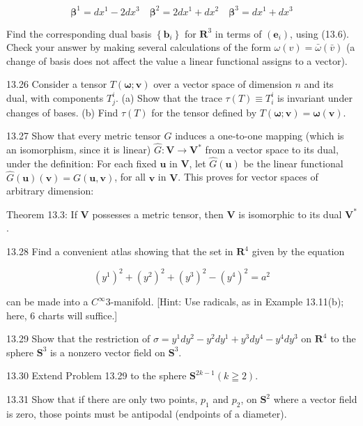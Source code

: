 \documentclass[10pt]{article}
\begin{document}
$$
\boldsymbol{\beta}^{1}=d x^{1}-2 d x^{3} \quad \boldsymbol{\beta}^{2}=2 d x^{1}+d x^{2} \quad \boldsymbol{\beta}^{3}=d x^{1}+d x^{3}
$$

Find the corresponding dual basis $\left\{\mathbf{b}_{i}\right\}$ for $\mathbf{R}^{3}$ in terms of $\left(\mathbf{e}_{i}\right)$, using (13.6). Check your answer by making several calculations of the form $\omega(v)=\bar{\omega}(\bar{v})$ (a change of basis does not affect the value a linear functional assigns to a vector).

13.26 Consider a tensor $T(\boldsymbol{\omega} ; \mathbf{v})$ over a vector space of dimension $n$ and its dual, with components $T_{j}^{i}$. (a) Show that the trace $\tau(T) \equiv T_{i}^{i}$ is invariant under changes of bases. (b) Find $\tau(T)$ for the tensor defined by $T(\boldsymbol{\omega} ; \mathbf{v})=\boldsymbol{\omega}(\mathbf{v})$.

13.27 Show that every metric tensor $G$ induces a one-to-one mapping (which is an isomorphism, since it is linear) $\hat{G}: \mathbf{V} \rightarrow \mathbf{V}^{*}$ from a vector space to its dual, under the definition: For each fixed $\mathbf{u}$ in $\mathbf{V}$, let $\hat{G}(\mathbf{u})$ be the linear functional $\hat{G}(\mathbf{u})(\mathbf{v})=G(\mathbf{u}, \mathbf{v})$, for all $\mathbf{v}$ in $\mathbf{V}$. This proves for vector spaces of arbitrary dimension:

Theorem 13.3: If $\mathbf{V}$ possesses a metric tensor, then $\mathbf{V}$ is isomorphic to its dual $\mathbf{V}^{*}$.

13.28 Find a convenient atlas showing that the set in $\mathbf{R}^{4}$ given by the equation

$$
\left(y^{1}\right)^{2}+\left(y^{2}\right)^{2}+\left(y^{3}\right)^{2}-\left(y^{4}\right)^{2}=a^{2}
$$

can be made into a $C^{\infty} 3$-manifold. [Hint: Use radicals, as in Example 13.11(b); here, 6 charts will suffice.]

13.29 Show that the restriction of $\sigma=y^{1} d y^{2}-y^{2} d y^{1}+y^{3} d y^{4}-y^{4} d y^{3}$ on $\mathbf{R}^{4}$ to the sphere $\mathbf{S}^{3}$ is a nonzero vector field on $\mathbf{S}^{3}$.

13.30 Extend Problem 13.29 to the sphere $\mathbf{S}^{2 k-1}(k \geqq 2)$.

13.31 Show that if there are only two points, $p_{1}$ and $p_{2}$, on $\mathbf{S}^{2}$ where a vector field is zero, those points must be antipodal (endpoints of a diameter).
\end{document}
